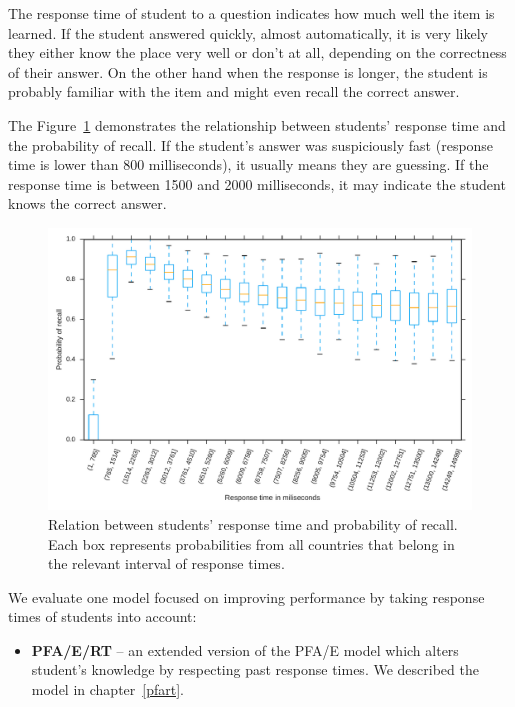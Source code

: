 The response time of student to a question indicates how much well the item is learned. If the student answered quickly, almost automatically, it is very likely they either know the place very well or don't at all, depending on the correctness of their answer. On the other hand when the response is longer, the student is probably familiar with the item and might even recall the correct answer.

The Figure~\ref{fig-response-time} demonstrates the relationship between students' response time and the probability of recall. If the student's answer was suspiciously fast (response time is lower than 800 milliseconds), it usually means they are guessing. If the response time is between 1500 and 2000 milliseconds, it may indicate the student knows the correct answer.

\begin{figure}[htbp]
  \centering
  \includegraphics[width=\textwidth]{img/response-time}
  \caption{Relation between students' response time and probability of recall. Each box represents probabilities from all countries that belong in the relevant interval of response times.}
  \label{fig-response-time}
\end{figure}

We evaluate one model focused on improving performance by taking response times of students into account:

\begin{itemize}
  \item \textbf{PFA/E/RT} -- an extended version of the PFA/E model which alters student's knowledge by respecting past response times. We described the model in chapter~\ref{pfart}.
\end{itemize}

